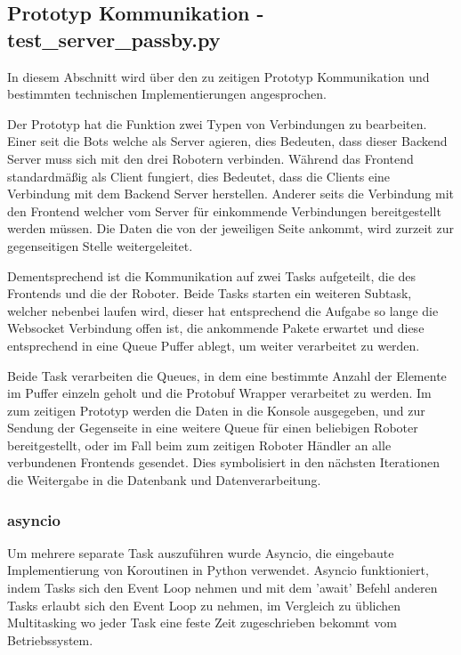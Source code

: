 \subsection{Prototyp Kommunikation - test\_server\_passby.py}
In diesem Abschnitt wird über den zu zeitigen Prototyp Kommunikation 
und bestimmten technischen Implementierungen angesprochen.

Der Prototyp hat die Funktion zwei Typen von Verbindungen zu bearbeiten.
% 
Einer seit die Bots welche als Server agieren, 
dies Bedeuten, dass dieser Backend Server muss sich mit den drei Robotern verbinden.
Während das Frontend standardmäßig als Client fungiert, 
dies Bedeutet, dass die Clients eine Verbindung mit dem Backend Server herstellen.
% 
Anderer seits die Verbindung mit den Frontend 
welcher vom Server für einkommende Verbindungen bereitgestellt werden müssen.
% 
Die Daten die von der jeweiligen Seite ankommt, 
wird zurzeit zur gegenseitigen Stelle weitergeleitet.

Dementsprechend ist die Kommunikation auf zwei Tasks aufgeteilt,
die des Frontends und die der Roboter.
Beide Tasks starten ein weiteren Subtask, welcher nebenbei laufen wird, 
dieser hat entsprechend die Aufgabe so lange die Websocket Verbindung offen ist,
die ankommende Pakete erwartet und diese entsprechend in eine Queue Puffer ablegt, 
um weiter verarbeitet zu werden. 

Beide Task verarbeiten die Queues, 
in dem eine bestimmte Anzahl der Elemente im Puffer 
einzeln geholt und die Protobuf Wrapper verarbeitet zu werden.
% 
Im zum zeitigen Prototyp werden die Daten in die Konsole ausgegeben,
und zur Sendung der Gegenseite in eine weitere Queue 
für einen beliebigen Roboter bereitgestellt, 
oder im Fall beim zum zeitigen Roboter Händler an alle verbundenen Frontends gesendet.
% 
Dies symbolisiert in den nächsten Iterationen die Weitergabe 
in die Datenbank und Datenverarbeitung.


\subsubsection{asyncio}
Um mehrere separate Task auszuführen wurde Asyncio,
die eingebaute Implementierung von Koroutinen in Python verwendet.
% 
Asyncio funktioniert, indem Tasks sich den Event Loop nehmen und mit dem 'await' 
Befehl anderen Tasks erlaubt sich den Event Loop zu nehmen, 
im Vergleich zu üblichen Multitasking
wo jeder Task eine feste Zeit zugeschrieben bekommt vom Betriebssystem.

